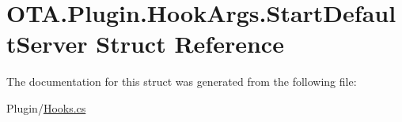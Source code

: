 \hypertarget{struct_o_t_a_1_1_plugin_1_1_hook_args_1_1_start_default_server}{}\section{O\+T\+A.\+Plugin.\+Hook\+Args.\+Start\+Default\+Server Struct Reference}
\label{struct_o_t_a_1_1_plugin_1_1_hook_args_1_1_start_default_server}


The documentation for this struct was generated from the following file\+:\begin{DoxyCompactItemize}
\item 
Plugin/\hyperlink{_hooks_8cs}{Hooks.\+cs}\end{DoxyCompactItemize}
